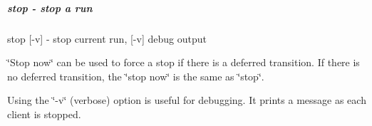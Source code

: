  \label{RC_odbedit_examples_idx_run_stop}
\hypertarget{RC_odbedit_examples_idx_run_stop}{}
 \hypertarget{RC_odbedit_examples_RC_odbedit_stop}{}\subparagraph{stop -\/ stop a run}\label{RC_odbedit_examples_RC_odbedit_stop}

\begin{DoxyCode}
stop [-v]               - stop current run, [-v] debug output
\end{DoxyCode}
 \par
 
 \label{RC_odbedit_examples_idx_run_stop_immediately}
\hypertarget{RC_odbedit_examples_idx_run_stop_immediately}{}
 \char`\"{}Stop now\char`\"{} can be used to force a stop if there is a deferred transition. If there is no deferred transition, the \char`\"{}stop now\char`\"{} is the same as \char`\"{}stop\char`\"{}. 
\begin{DoxyCode}
local:bnmr:R]/>stop now
Run #30129 stopped
\end{DoxyCode}
 Using the \char`\"{}-\/v\char`\"{} (verbose) option is useful for debugging. It prints a message as each client is stopped.

\label{RC_odbedit_examples_RC_transition_stop}
\hypertarget{RC_odbedit_examples_RC_transition_stop}{}



